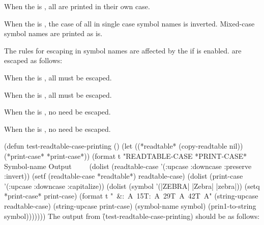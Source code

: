 
 When the  is ,
 all   are printed in their own case.
 

 When the  is ,
 the case of all   
 in single case symbol names is inverted.
 Mixed-case symbol names are printed as is.
\endlist 

The rules for escaping   in symbol names are affected by
the  
if  is enabled.
  are escaped as follows:                
\beginlist
{}

When the  is ,
all   must be escaped.


When the  is ,
all   must be escaped.


When the  is , 
no   need be escaped.


When the  is ,
no   need be escaped.

\endlist    


\code
 (defun test-readtable-case-printing ()
   (let ((*readtable* (copy-readtable nil))
         (*print-case* *print-case*))
     (format t "READTABLE-CASE *PRINT-CASE*  Symbol-name  Output~
              ~%
              ~%
     (dolist (readtable-case '(:upcase :downcase :preserve :invert))
       (setf (readtable-case *readtable*) readtable-case)
       (dolist (print-case '(:upcase :downcase :capitalize))
         (dolist (symbol '(|ZEBRA| |Zebra| |zebra|))
           (setq *print-case* print-case)
           (format t "~&:~A~15T:~A~29T~A~42T~A"
                   (string-upcase readtable-case)
                   (string-upcase print-case)
                   (symbol-name symbol)
                   (prin1-to-string symbol)))))))
\endcode
  The output from \f{(test-readtable-case-printing)} should be as follows:

